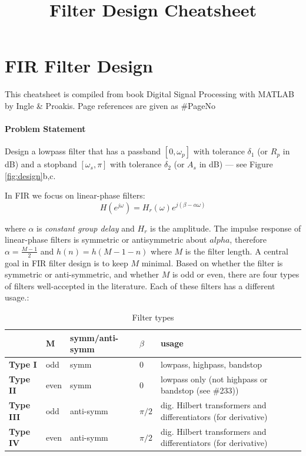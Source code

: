\documentclass{article}
\begin{document}
\title{\bf Filter Design Cheatsheet}
\maketitle

\section{FIR Filter Design}
This cheatsheet is compiled from book Digital Signal Processing with MATLAB by Ingle \& Proakis. Page references are given as \#PageNo

\paragraph{Problem Statement}
Design a lowpass filter that has a passband $[0,\omega_p]$ with tolerance $\delta_1$ (or $R_p$ in dB) and a stopband $[\omega_s, \pi]$ with tolerance $\delta_2$ (or $A_s$ in dB) \---- see Figure \ref{fig:design}b,c.

In FIR we focus on linear-phase filters:
\begin{equation}
H(e^{j\omega})=H_r(\omega)e^{j(\beta-\alpha\omega)}
\end{equation}

where $\alpha$ is \textit{constant group delay} and $H_r$ is the amplitude. The impulse response of linear-phase filters is symmetric or antisymmetric about $alpha$, therefore $\alpha=\frac{M-1}{2}$ and $h(n)=h(M-1-n)$ where $M$ is the filter length. A central goal in FIR filter design is to keep $M$ minimal. Based on whether the filter is symmetric or anti-symmetric, and whether $M$ is odd or even, there are four types of filters well-accepted in the literature. Each of these filters has a different usage.:

\begin{table}[h]
\centering
\begin{tabular}{|l|l|l|l|l|} \hline
 & M & symm/anti-symm  & $\beta$ & usage \\ \hline
\textbf{Type I} & odd & symm & 0 & lowpass, highpass, bandstop \\
\textbf{Type II} & even & symm & 0 & lowpass only (not highpass or bandstop (see \#233)) \\
\textbf{Type III} & odd & anti-symm & $\pi/2$ & dig. Hilbert transformers and differentiators (for derivative)\\
\textbf{Type IV} & even & anti-symm & $\pi/2$ & dig. Hilbert transformers and differentiators (for derivative)\\ \hline
\end{tabular}
\caption{Filter types}
\label{tab:types}
\end{table}
\end{document}
